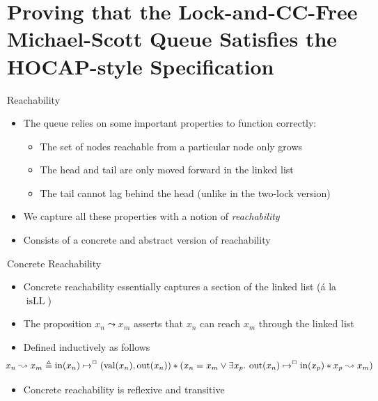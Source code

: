 \documentclass[9pt]{beamer}
\newcommand{\isLL}{\operatorname{isLL}}
\newcommand{\nIn}[1]{\operatorname{in}(#1)}
\newcommand{\nVal}[1]{\operatorname{val}(#1)}
\newcommand{\nOut}[1]{\operatorname{out}(#1)}
\newcommand{\node}{x}
\newcommand{\nodeM}[1]{\node_{#1}}
\newcommand{\isNode}[1]{\nIn{#1} \mapsto^{\persistently} (\nVal{#1}, \nOut{#1})}
\newcommand{\reach}[2]{#1 \leadsto #2}
\begin{document}

\section{Proving that the Lock-and-CC-Free Michael-Scott Queue Satisfies the HOCAP-style Specification}

\begin{frame}{Reachability}
  \begin{itemize}
    \item The queue relies on some important properties to function correctly:
      \begin{itemize}
        \item The set of nodes reachable from a particular node only grows
        \item The head and tail are only moved forward in the linked list
        \item The tail cannot lag behind the head (unlike in the two-lock version)
      \end{itemize}
    \item We capture all these properties with a notion of \textit{reachability}
    \item Consists of a concrete and abstract version of reachability
  \end{itemize}
  \begin{block}{Concrete Reachability}
    \begin{itemize}
      \item Concrete reachability essentially captures a section of the linked list (á la $\isLL$)
      \item The proposition $\reach{\nodeM{n}}{\nodeM{m}}$ asserts that $\nodeM{n}$ can reach $\nodeM{m}$ through the linked list
      \item Defined inductively as follows
    \begin{equation*}
      \hspace{-2em}\reach{\nodeM{n}}{\nodeM{m}} \eqdef \isNode{\nodeM{n}} \star{} (\nodeM{n} = \nodeM{m} \lor{} \Exists \nodeM{p} . \nOut{\nodeM{n}} \mapsto^{\persistently} \nIn{\nodeM{p}} \star{} \reach{\nodeM{p}}{\nodeM{m}})
    \end{equation*}
      \item Concrete reachability is reflexive and transitive
    \end{itemize}
  \end{block}
\end{frame}
\end{document}
